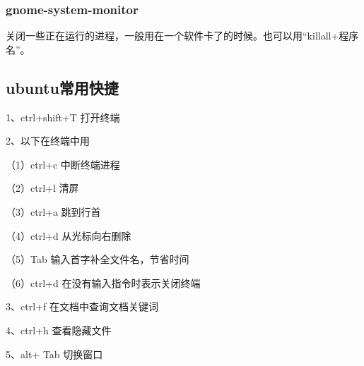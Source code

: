 \documentclass[12pt]{article}
\begin{document}
\subsubsection{gnome-system-monitor}
关闭一些正在运行的进程，一般用在一个软件卡了的时候。也可以用“killall+程序名”。
\subsection{ubuntu常用快捷}
1、ctrl+shift+T 打开终端

2、以下在终端中用

  （1）ctrl+c 中断终端进程

  （2）ctrl+l 清屏

 （3）ctrl+a 跳到行首

 （4）ctrl+d 从光标向右删除

 （5）Tab  输入首字补全文件名，节省时间

  （6）ctrl+d 在没有输入指令时表示关闭终端

3、ctrl+f 在文档中查询文档关键词 
 
4、ctrl+h 查看隐藏文件

5、alt+	Tab 切换窗口
\end{document}

